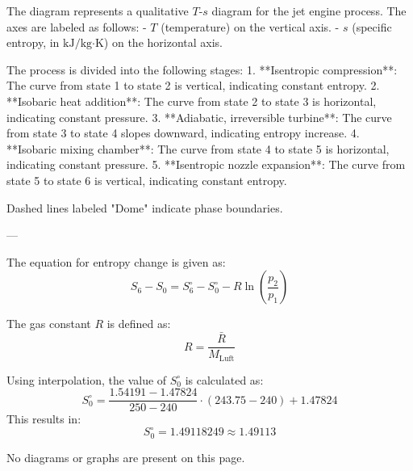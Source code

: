 The diagram represents a qualitative \( T \)-\( s \) diagram for the jet engine process. The axes are labeled as follows:  
- \( T \) (temperature) on the vertical axis.  
- \( s \) (specific entropy, in \( \text{kJ}/\text{kg·K} \)) on the horizontal axis.  

The process is divided into the following stages:  
1. **Isentropic compression**: The curve from state 1 to state 2 is vertical, indicating constant entropy.  
2. **Isobaric heat addition**: The curve from state 2 to state 3 is horizontal, indicating constant pressure.  
3. **Adiabatic, irreversible turbine**: The curve from state 3 to state 4 slopes downward, indicating entropy increase.  
4. **Isobaric mixing chamber**: The curve from state 4 to state 5 is horizontal, indicating constant pressure.  
5. **Isentropic nozzle expansion**: The curve from state 5 to state 6 is vertical, indicating constant entropy.  

Dashed lines labeled "Dome" indicate phase boundaries.  

---

The equation for entropy change is given as:  
\[
S_6 - S_0 = S^\circ_6 - S^\circ_0 - R \ln \left( \frac{p_2}{p_1} \right)
\]  

The gas constant \( R \) is defined as:  
\[
R = \frac{\bar{R}}{M_{\text{Luft}}}
\]  

Using interpolation, the value of \( S^\circ_0 \) is calculated as:  
\[
S^\circ_0 = \frac{1.54191 - 1.47824}{250 - 240} \cdot (243.75 - 240) + 1.47824
\]  
This results in:  
\[
S^\circ_0 = 1.49118249 \approx 1.49113
\]  

No diagrams or graphs are present on this page.